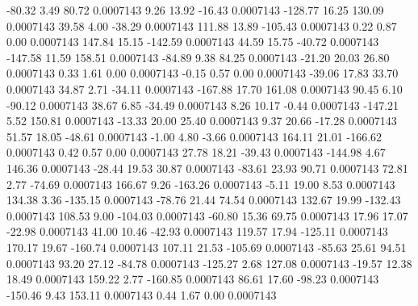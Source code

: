       -80.32        3.49       80.72     0.0007143
        9.26       13.92      -16.43     0.0007143
     -128.77       16.25      130.09     0.0007143
       39.58        4.00      -38.29     0.0007143
      111.88       13.89     -105.43     0.0007143
        0.22        0.87        0.00     0.0007143
      147.84       15.15     -142.59     0.0007143
       44.59       15.75      -40.72     0.0007143
     -147.58       11.59      158.51     0.0007143
      -84.89        9.38       84.25     0.0007143
      -21.20       20.03       26.80     0.0007143
        0.33        1.61        0.00     0.0007143
       -0.15        0.57        0.00     0.0007143
      -39.06       17.83       33.70     0.0007143
       34.87        2.71      -34.11     0.0007143
     -167.88       17.70      161.08     0.0007143
       90.45        6.10      -90.12     0.0007143
       38.67        6.85      -34.49     0.0007143
        8.26       10.17       -0.44     0.0007143
     -147.21        5.52      150.81     0.0007143
      -13.33       20.00       25.40     0.0007143
        9.37       20.66      -17.28     0.0007143
       51.57       18.05      -48.61     0.0007143
       -1.00        4.80       -3.66     0.0007143
      164.11       21.01     -166.62     0.0007143
        0.42        0.57        0.00     0.0007143
       27.78       18.21      -39.43     0.0007143
     -144.98        4.67      146.36     0.0007143
      -28.44       19.53       30.87     0.0007143
      -83.61       23.93       90.71     0.0007143
       72.81        2.77      -74.69     0.0007143
      166.67        9.26     -163.26     0.0007143
       -5.11       19.00        8.53     0.0007143
      134.38        3.36     -135.15     0.0007143
      -78.76       21.44       74.54     0.0007143
      132.67       19.99     -132.43     0.0007143
      108.53        9.00     -104.03     0.0007143
      -60.80       15.36       69.75     0.0007143
       17.96       17.07      -22.98     0.0007143
       41.00       10.46      -42.93     0.0007143
      119.57       17.94     -125.11     0.0007143
      170.17       19.67     -160.74     0.0007143
      107.11       21.53     -105.69     0.0007143
      -85.63       25.61       94.51     0.0007143
       93.20       27.12      -84.78     0.0007143
     -125.27        2.68      127.08     0.0007143
      -19.57       12.38       18.49     0.0007143
      159.22        2.77     -160.85     0.0007143
       86.61       17.60      -98.23     0.0007143
     -150.46        9.43      153.11     0.0007143
        0.44        1.67        0.00     0.0007143
